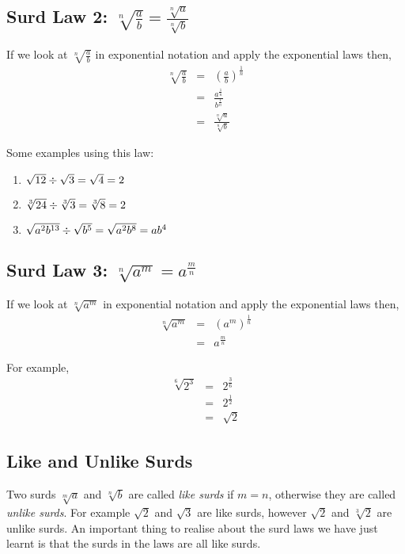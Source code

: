 \subsection{Surd Law 2: $\sqrt[n]{\frac ab}=\frac{\sqrt[n]{a}}{\sqrt[n]{b}}$}
If we look at $\sqrt[n]{\frac ab}$ in exponential notation and
apply the exponential laws then,
\begin{eqnarray}
\label{eq:mn:s:2:exp}
\sqrt[n]{\frac ab}&=&\left(\frac ab\right)^{\frac 1n}\\ \nonumber
&=&\frac{a^{\frac 1n}}{b^{\frac 1n}}\\ \nonumber
&=&\frac{\sqrt[n]{a}}{\sqrt[n]{b}}
\end{eqnarray}

Some examples using this law:
\begin{enumerate}
\item{$\sqrt{12}\div \sqrt{3}\\=\sqrt{4}\\=2$}
\item{$\sqrt[3]{24}\div \sqrt[3]{3}\\=\sqrt[3]{8}\\=2$}
\item{$\sqrt{a^2b^{13}}\div \sqrt{b^5}\\=\sqrt{a^2b^8}\\= ab^4$}
\end{enumerate}


\subsection{Surd Law 3: $\sqrt[n]{a^m}=a^{\frac mn}$}
If we look at $\sqrt[n]{a^m}$ in exponential notation and apply the exponential laws then,
\begin{eqnarray}
\label{eq:mn:s:3:exp}
\sqrt[n]{a^m}&=&(a^m)^{\frac 1n}\\ \nonumber
&=&a^{\frac mn}
\end{eqnarray}

For example,
\begin{eqnarray*}
\sqrt[6]{2^{3}} &=& 2^{\frac{3}{6}}\\
&=& 2^{\frac{1}{2}}\\
&=& \sqrt{2}
\end{eqnarray*}

\subsection{Like and Unlike Surds}
Two surds $\sqrt[m]{a}$ and $\sqrt[n]{b}$ are called \textit{like surds} if
$m=n$, otherwise they are called \textit{unlike surds}. For example $\sqrt{2}$ and $\sqrt{3}$ are like surds, however $\sqrt{2}$ and $\sqrt[3]{2}$ are unlike surds. An important thing to realise about the surd laws we have just learnt is that the surds in the laws are all like surds.

